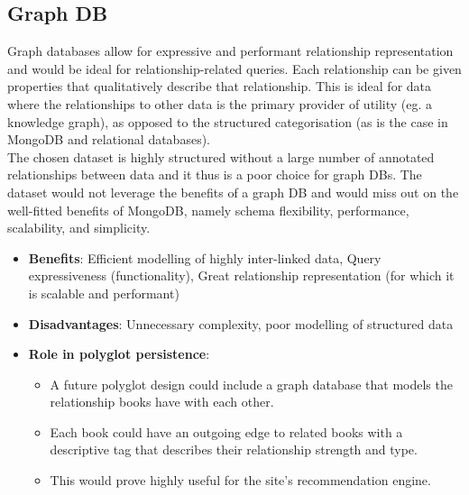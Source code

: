 \documentclass[11pt]{article}
\begin{document}
\subsection{Graph DB}
\label{sec:org77b90d5}
Graph databases allow for expressive and performant relationship representation and would be ideal for relationship-related queries. Each relationship can be given properties that qualitatively describe that relationship. This is ideal for data where the relationships to other data is the primary provider of utility (eg. a knowledge graph), as opposed to the structured categorisation (as is the case in MongoDB and relational databases).\\
\linebreak
The chosen dataset is highly structured without a large number of annotated relationships between data and it thus is a poor choice for graph DBs. The dataset would not leverage the benefits of a graph DB and would miss out on the well-fitted benefits of MongoDB, namely schema flexibility, performance, scalability, and simplicity.

\begin{itemize}
\item \textbf{Benefits}: Efficient modelling of highly inter-linked data, Query expressiveness (functionality), Great relationship representation (for which it is scalable and performant)
\item \textbf{Disadvantages}: Unnecessary complexity, poor modelling of structured data
\item \textbf{Role in polyglot persistence}:
\begin{itemize}
\item A future polyglot design could include a graph database that models the relationship books have with each other.
\item Each book could have an outgoing edge to related books with a descriptive tag that describes their relationship strength and type.
\item This would prove highly useful for the site's recommendation engine.
\end{itemize}
\end{itemize}
\end{document}
